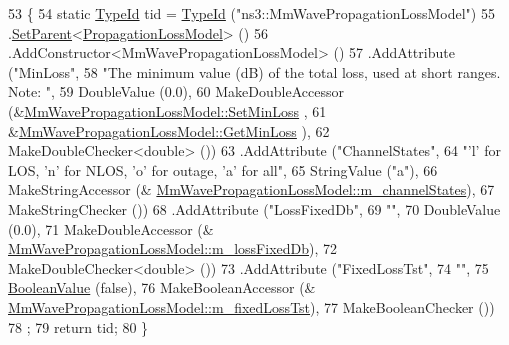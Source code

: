 \begin{DoxyCode}
53 \{
54   \textcolor{keyword}{static} \hyperlink{classns3_1_1TypeId}{TypeId} tid = \hyperlink{classns3_1_1TypeId}{TypeId} (\textcolor{stringliteral}{"ns3::MmWavePropagationLossModel"})
55     .\hyperlink{classns3_1_1TypeId_abaaca67ab7d2471067e7c275df0f7309}{SetParent}<\hyperlink{classns3_1_1PropagationLossModel}{PropagationLossModel}> ()
56     .AddConstructor<MmWavePropagationLossModel> ()
57     .AddAttribute (\textcolor{stringliteral}{"MinLoss"},
58                    \textcolor{stringliteral}{"The minimum value (dB) of the total loss, used at short ranges. Note: "},
59                    DoubleValue (0.0),
60                    MakeDoubleAccessor (&\hyperlink{classMmWavePropagationLossModel_a9d5cd23f54e442ff2de45f49c1804a67}{MmWavePropagationLossModel::SetMinLoss}
      ,
61                                        &\hyperlink{classMmWavePropagationLossModel_a88dc9a8dc35ab474d141ad00b94f3afc}{MmWavePropagationLossModel::GetMinLoss}
      ),
62                    MakeDoubleChecker<double> ())
63     .AddAttribute (\textcolor{stringliteral}{"ChannelStates"},
64                                                                         \textcolor{stringliteral}{"'l' for LOS, 'n' for NLOS, 'o' for
       outage, 'a' for all"},
65                                                                         StringValue (\textcolor{stringliteral}{"a"}),
66                                                                         MakeStringAccessor (&
      \hyperlink{classMmWavePropagationLossModel_a81e39f0546fa8b255b69fecc8cea09a0}{MmWavePropagationLossModel::m\_channelStates}),
67                                                                         MakeStringChecker ())
68                 .AddAttribute (\textcolor{stringliteral}{"LossFixedDb"},
69                                                                          \textcolor{stringliteral}{""},
70                                                                          DoubleValue (0.0),
71                                                                          MakeDoubleAccessor (&
      \hyperlink{classMmWavePropagationLossModel_ac98b19feec18d35be80210ca4cc0e511}{MmWavePropagationLossModel::m\_lossFixedDb}),
72                                                                          MakeDoubleChecker<double> ())
73                 .AddAttribute (\textcolor{stringliteral}{"FixedLossTst"},
74                                                                          \textcolor{stringliteral}{""},
75                                                                          
      \hyperlink{classns3_1_1BooleanValue}{BooleanValue} (\textcolor{keyword}{false}),
76                                                                          MakeBooleanAccessor (&
      \hyperlink{classMmWavePropagationLossModel_adfb40829a9026be7819bb25925dc2eb1}{MmWavePropagationLossModel::m\_fixedLossTst}),
77                                                                          MakeBooleanChecker ())
78   ;
79   \textcolor{keywordflow}{return} tid;
80 \}
\end{DoxyCode}


